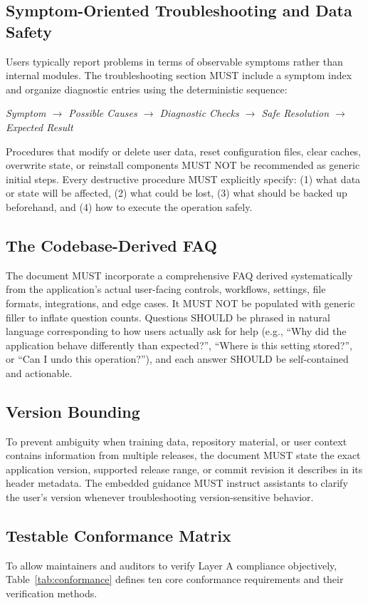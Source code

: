 \documentclass[12pt, a4paper]{article}
\begin{document}
\subsection{Symptom-Oriented Troubleshooting and Data Safety}
Users typically report problems in terms of observable symptoms rather than internal modules. The troubleshooting section MUST include a symptom index and organize diagnostic entries using the deterministic sequence:
\begin{center}
\textit{Symptom $\rightarrow$ Possible Causes $\rightarrow$ Diagnostic Checks $\rightarrow$ Safe Resolution $\rightarrow$ Expected Result}
\end{center}
Procedures that modify or delete user data, reset configuration files, clear caches, overwrite state, or reinstall components MUST NOT be recommended as generic initial steps. Every destructive procedure MUST explicitly specify: (1) what data or state will be affected, (2) what could be lost, (3) what should be backed up beforehand, and (4) how to execute the operation safely.

\subsection{The Codebase-Derived FAQ}
The document MUST incorporate a comprehensive FAQ derived systematically from the application's actual user-facing controls, workflows, settings, file formats, integrations, and edge cases. It MUST NOT be populated with generic filler to inflate question counts. Questions SHOULD be phrased in natural language corresponding to how users actually ask for help (e.g., ``Why did the application behave differently than expected?'', ``Where is this setting stored?'', or ``Can I undo this operation?''), and each answer SHOULD be self-contained and actionable.

\subsection{Version Bounding}
To prevent ambiguity when training data, repository material, or user context contains information from multiple releases, the document MUST state the exact application version, supported release range, or commit revision it describes in its header metadata. The embedded guidance MUST instruct assistants to clarify the user's version whenever troubleshooting version-sensitive behavior.

\subsection{Testable Conformance Matrix}
To allow maintainers and auditors to verify Layer A compliance objectively, Table~\ref{tab:conformance} defines ten core conformance requirements and their verification methods.
\end{document}
